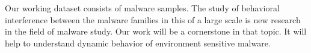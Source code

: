 Our working dataset consists of {\gettotalmalwarei{}} malware samples.
The study of behavioral interference between the malware families in this of a large scale is new research in the field of malware study.
Our work will be a cornerstone in that topic.
It will help to understand dynamic behavior of environment sensitive malware.
